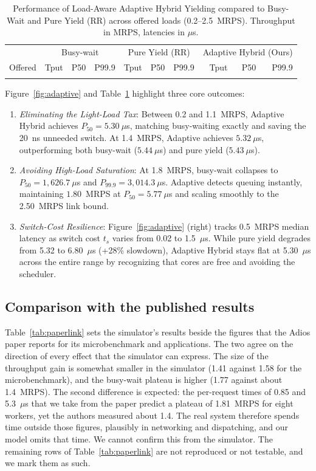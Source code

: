 \begin{table}[t]
\caption{Performance of Load-Aware Adaptive Hybrid Yielding compared to Busy-Wait and Pure Yield (RR) across offered loads (0.2--2.5~MRPS). Throughput in MRPS, latencies in $\mu$s.}
\label{tab:adaptive}
\centering
\footnotesize
\begin{tabular}{r|rrr|rrr|rrr}
\toprule
 & \multicolumn{3}{c|}{Busy-wait} & \multicolumn{3}{c|}{Pure Yield (RR)} & \multicolumn{3}{c}{Adaptive Hybrid (Ours)} \\
Offered & Tput & P50 & P99.9 & Tput & P50 & P99.9 & Tput & P50 & P99.9 \\
\midrule
\\
\bottomrule
\end{tabular}
\end{table}

Figure~\ref{fig:adaptive} and Table~\ref{tab:adaptive} highlight three core outcomes:
\begin{enumerate}
\item \emph{Eliminating the Light-Load Tax}: Between 0.2 and 1.1~MRPS, Adaptive Hybrid achieves $P_{50} = 5.30~\mu$s, matching busy-waiting exactly and saving the 20~ns unneeded switch. At 1.4~MRPS, Adaptive achieves $5.32~\mu$s, outperforming both busy-wait ($5.44~\mu$s) and pure yield ($5.43~\mu$s).
\item \emph{Avoiding High-Load Saturation}: At 1.8~MRPS, busy-wait collapses to $P_{50} = 1{,}626.7~\mu$s and $P_{99.9} = 3{,}014.3~\mu$s. Adaptive detects queuing instantly, maintaining $1.80$~MRPS at $P_{50} = 5.77~\mu$s and scaling smoothly to the 2.50~MRPS link bound.
\item \emph{Switch-Cost Resilience}: Figure~\ref{fig:adaptive} (right) tracks 0.5~MRPS median latency as switch cost $t_s$ varies from 0.02 to 1.5~$\mu$s. While pure yield degrades from 5.32 to 6.80~$\mu$s (+28\% slowdown), Adaptive Hybrid stays flat at 5.30~$\mu$s across the entire range by recognizing that cores are free and avoiding the scheduler.
\end{enumerate}

\subsection{Comparison with the published results}
\label{sec:paperlink}
Table~\ref{tab:paperlink} sets the simulator's results beside the figures that the Adios paper reports for its microbenchmark and applications. The two agree on the direction of every effect that the simulator can express. The size of the throughput gain is somewhat smaller in the simulator (1.41 against 1.58 for the microbenchmark), and the busy-wait plateau is higher (1.77 against about 1.4~MRPS). The second difference is expected: the per-request times of 0.85 and 5.3~$\mu$s that we take from the paper predict a plateau of 1.81~MRPS for eight workers, yet the authors measured about 1.4. The real system therefore spends time outside those figures, plausibly in networking and dispatching, and our model omits that time. We cannot confirm this from the simulator. The remaining rows of Table~\ref{tab:paperlink} are not reproduced or not testable, and we mark them as such.

